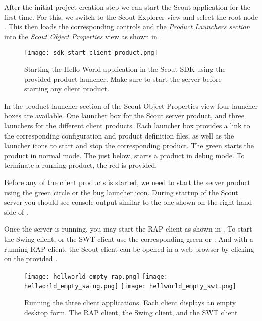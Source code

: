 %

After the initial project creation step we can start the Scout application for the first time.
For this, we switch to the Scout Explorer view and select the root node .
This then loads the corresponding controls and the \textit{Product Launchers section} into the \textit{Scout Object Properties} view as shown in .

\begin{figure}
\texttt{[image: sdk\_start\_client\_product.png]} 
\caption{Starting the Hello World application in the Scout SDK using the provided product launcher. Make sure to start the server before starting any client product.}
\end{figure}

In the product launcher section of the Scout Object Properties view four launcher boxes are available. 
One launcher box for the Scout server product, and three launchers for the different client products.
Each launcher box provides a link to the corresponding configuration and product definition files, as well as the launcher icons to start and stop the corresponding product.
The green  starts the product in normal mode.
The  just below, starts a product in debug mode.
To terminate a running product, the red  is provided. 

Before any of the client products is started, we need to start the server product using the green circle or the bug launcher icon.
During startup of the Scout server you should see console output similar to the one shown on the right hand side of .

Once the server is running, you may start the RAP client as shown in .
To start the Swing client, or the SWT client use the corresponding green  or .
And with a running RAP client, the Scout client can be opened in a web browser by clicking on the provided .

\begin{figure}
\texttt{[image: hellworld\_empty\_rap.png]} \hspace{3mm}
\texttt{[image: hellworld\_empty\_swing.png]} \hspace{3mm}
\texttt{[image: hellworld\_empty\_swt.png]}
\caption{Running the three client applications. 
Each client displays an empty desktop form. 
The RAP client, the Swing client, and the SWT client}
\end{figure}


